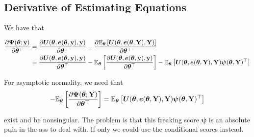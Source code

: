 \documentclass[twoside,11pt]{article}
\newcommand{\E}{{\mathbb{E}}}
\begin{document}
\subsection{Derivative of Estimating Equations}
We have that

\begin{align}
    \frac{\partial\bm\Psi(\bt;\y)}{\partial\bt^\top} &= \frac{\partial \bm U(\bt, \e(\bt, \y), \y)}{\partial \bt^\top} - \frac{\partial \E_\bt\left[\bm U(\bt, \e(\bt, \Y), \Y)\right]}{\partial \bt^\top}\\
    &= \frac{\partial \bm U(\bt, \e(\bt, \y), \y)}{\partial \bt^\top} - \E_\bt\left[\frac{\partial \bm U(\bt, \e(\bt, \y), \y)}{\partial \bt^\top}\right] - \E_\bt\left[\bm U(\bt, \e(\bt, \Y), \Y) \bm \psi(\bt, \Y)^\top\right]
    \label{eqn:dpsi}
\end{align}

For asymptotic normality, we need that 
\begin{align}
    -\E_{\bt}\left[\frac{\partial\bm\Psi(\bt;\Y)}{\partial\bt^\top}\right] = \E_\bt\left[\bm U(\bt, \e(\bt, \Y), \Y) \bm \psi(\bt, \Y)^\top\right]
    \label{eqn:dpsi}
\end{align}

exist and be nonsingular. The problem is that this freaking score $\bm\psi$ is an absolute pain in the ass to deal with. If only we could use the conditional scores instead.
\end{document}
